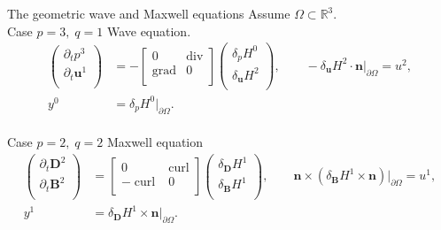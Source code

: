 \documentclass[aspectratio=169]{beamer}
\DeclareMathOperator*{\grad}{grad}
\renewcommand{\div}{\operatorname{div}}
\DeclareMathOperator*{\curl}{curl}
\newcommand{\bbR}{\mathbb{R}}
\begin{document}
\begin{frame}{The geometric wave and Maxwell equations}
	Assume $\Omega \subset \bbR^3$. \\
	Case $p=3, \; q=1$ Wave equation.
	\begin{equation*}
			\begin{aligned}
				\begin{pmatrix}
					\partial_t p^3 \\
					\partial_t \bm{u}^1\\
				\end{pmatrix} &= 
				-\begin{bmatrix}
					0 & \div \\
					\grad & 0 \\
				\end{bmatrix}
				\begin{pmatrix}
					\delta_{p} H^{0}\\
					\delta_{\bm{u}} H^{2}\\
				\end{pmatrix}, \qquad -\delta_{\bm{u}} H^{2} \cdot \bm{n}|_{\partial\Omega}  = u^{2}, \\
				y^{0} &= \delta_{p} H^{0}|_{\partial\Omega}.
			\end{aligned}	
	\end{equation*}
	\vspace{.5cm}\\
	Case $p=2, \;q=2$ Maxwell equation
	\begin{equation*}
		\begin{aligned}
			\begin{pmatrix}
				\partial_t \bm{D}^2 \\
				\partial_t \bm{B}^2\\
			\end{pmatrix} &= 
			\begin{bmatrix}
				0 & \curl \\
				-\curl & 0 \\
			\end{bmatrix}
			\begin{pmatrix}
				\delta_{\bm{D}} H^{1}\\
				\delta_{\bm{B}} H^{1}\\
			\end{pmatrix}, \qquad \bm{n} \times (\delta_{\bm{B}} H^{1} \times \bm{n})|_{\partial\Omega} = u^{1}, \\
			y^{1} &= \delta_{\bm{D}} H^{1} \times \bm{n}|_{\partial\Omega}. 
		\end{aligned}	
	\end{equation*}
	
\end{frame}
\end{document}
